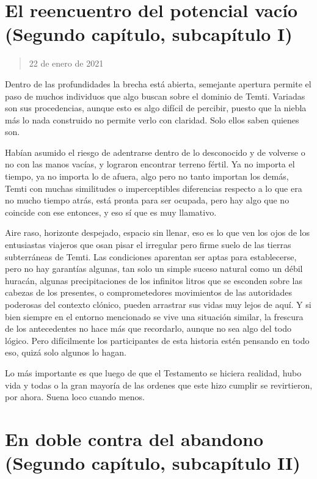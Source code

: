 \documentclass[
  spanish,
]{book}
\begin{document}
\hypertarget{el-reencuentro-del-potencial-vacuxedo-segundo-capuxedtulo-subcapuxedtulo-i}{%
\section{El reencuentro del potencial vacío (Segundo capítulo, subcapítulo I)}\label{el-reencuentro-del-potencial-vacuxedo-segundo-capuxedtulo-subcapuxedtulo-i}}

\begin{quote}
22 de enero de 2021
\end{quote}

Dentro de las profundidades la brecha está abierta, semejante apertura permite el paso de muchos individuos que algo buscan sobre el dominio de Temti. Variadas son sus procedencias, aunque esto es algo difícil de percibir, puesto que la niebla más lo nada construido no permite verlo con claridad. Solo ellos saben quienes son.

Habían asumido el riesgo de adentrarse dentro de lo desconocido y de volverse o no con las manos vacías, y lograron encontrar terreno fértil. Ya no importa el tiempo, ya no importa lo de afuera, algo pero no tanto importan los demás, Temti con muchas similitudes o imperceptibles diferencias respecto a lo que era no mucho tiempo atrás, está pronta para ser ocupada, pero hay algo que no coincide con ese entonces, y eso sí que es muy llamativo.

Aire raso, horizonte despejado, espacio sin llenar, eso es lo que ven los ojos de los entusiastas viajeros que osan pisar el irregular pero firme suelo de las tierras subterráneas de Temti. Las condiciones aparentan ser aptas para establecerse, pero no hay garantías algunas, tan solo un simple suceso natural como un débil huracán, algunas precipitaciones de los infinitos litros que se esconden sobre las cabezas de los presentes, o comprometedores movimientos de las autoridades poderosas del contexto clónico, pueden arrastrar sus vidas muy lejos de aquí. Y si bien siempre en el entorno mencionado se vive una situación similar, la frescura de los antecedentes no hace más que recordarlo, aunque no sea algo del todo lógico. Pero difícilmente los participantes de esta historia estén pensando en todo eso, quizá solo algunos lo hagan.

Lo más importante es que luego de que el Testamento se hiciera realidad, hubo vida y todas o la gran mayoría de las ordenes que este hizo cumplir se revirtieron, por ahora. Suena loco cuando menos.

\hypertarget{en-doble-contra-del-abandono-segundo-capuxedtulo-subcapuxedtulo-ii}{%
\section{En doble contra del abandono (Segundo capítulo, subcapítulo II)}\label{en-doble-contra-del-abandono-segundo-capuxedtulo-subcapuxedtulo-ii}}
\end{document}
